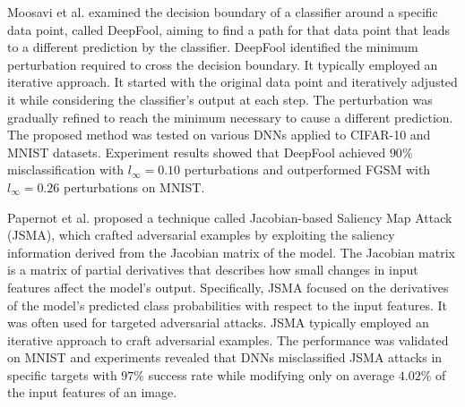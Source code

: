 \documentclass[sn-mathphys]{sn-jnl}%
\theoremstyle{thmstyleone}%
\theoremstyle{thmstyletwo}%
\theoremstyle{thmstylethree}%
\begin{document}
Moosavi et al. \cite{moosavi2016deepfool} examined the decision boundary of a classifier around a specific data point, called DeepFool, aiming to find a path for that data point that leads to a different prediction by the classifier. DeepFool identified the minimum perturbation required to cross the decision boundary. It typically employed an iterative approach. It started with the original data point and iteratively adjusted it while considering the classifier's output at each step. The perturbation was gradually refined to reach the minimum necessary to cause a different prediction. %
The proposed method was tested on various DNNs applied to CIFAR-10 \cite{krizhevsky2009learning} and MNIST \cite{mnist} datasets. Experiment results showed that DeepFool achieved $90\%$ misclassification with $l_{\infty} = 0.10$ perturbations and outperformed FGSM with $l_{\infty} = 0.26$ perturbations on MNIST.

Papernot et al. \cite{papernot2016limitations} proposed a technique called Jacobian-based Saliency Map Attack (JSMA), which crafted adversarial examples by exploiting the saliency information derived from the Jacobian matrix of the model. The Jacobian matrix is a matrix of partial derivatives that describes how small changes in input features affect the model's output. Specifically, JSMA focused on the derivatives of the model's predicted class probabilities with respect to the input features. It was often used for targeted adversarial attacks. %
JSMA typically employed an iterative approach to craft adversarial examples. %
The performance was validated on MNIST \cite{mnist} and experiments revealed that DNNs misclassified JSMA attacks in specific targets with $97\%$ success rate while modifying only on
average $4.02\%$ of the input features of an image.

\end{document}
